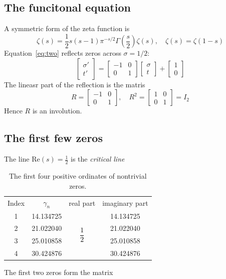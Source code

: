 \documentclass[twocolumn,10pt]{article}
\newcommand{\Real}{\text{Re}}
\begin{document}
\subsection{The funcitonal equation}
A symmetric form of the zeta function is
\begin{equation}
    \zeta(s) = \frac{1}{2}s(s-1)\pi^{-s/2}\Gamma\left(\frac{s}{2}\right)\zeta(s), \quad \zeta(s) = \zeta(1-s)
    \label{eq:two}
\end{equation}
Equation~\ref{eq:two} reflects zeros across $\sigma = 1/2$:
\[
\begin{bmatrix}
    \sigma'\\
    t'
\end{bmatrix} = \begin{bmatrix}
    -1 & 0\\
    0 & 1
\end{bmatrix}\begin{bmatrix}
    \sigma\\
    t
\end{bmatrix} + \begin{bmatrix}
    1\\
    0
\end{bmatrix}
\]
The lineasr part of the reflection is the matris
\begin{equation}
    R = \begin{bmatrix}
    -1 & 0\\
    0 & 1
\end{bmatrix}, \quad R^2 = \begin{bmatrix}
    1 & 0\\
    0 & 1
\end{bmatrix}=I_2
\end{equation}
Hence $R$ is an involution.
\subsection{The first few zeros}
The line $\Real(s) = \frac{1}{2}$ is the \emph{critical line}

\begin{table}[H]
    \centering
    \begin{tabular}{|c|c|c|c|}
        \rowcolor{Blue!50} Index & $\gamma_n$ & real part & imaginary part \\
        1 & 14.134725 & \multirow[c]{4}{*}{\textcolor{black}{$\dfrac{1}{2}$}} & 14.134725 \\
        2 & 21.022040 & & 21.022040 \\
        3 & 25.010858 & & 25.010858 \\
        4 & 30.424876 & & 30.424876 \\
        \bottomrule
    \end{tabular}
    \caption{ The first four positive ordinates of nontrivial zeros.}
    \label{tab:one}
\end{table}
The first two zeros form the matrix
\end{document}
